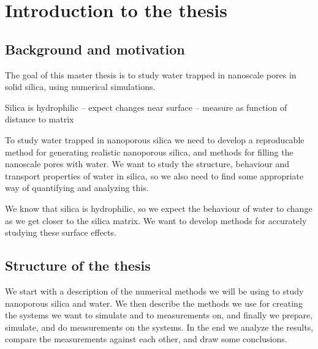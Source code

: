 \chapter*{Introduction to the thesis}%
%

\section*{Background and motivation}
%
The goal of this master thesis is to study water trapped in nanoscale pores in solid silica, using numerical simulations.  

Silica is hydrophilic -- expect changes near surface -- measure as function of distance to matrix


To study water trapped in nanoporous silica we need to develop a reproducable method for generating realistic nanoporous silica, and methods for filling the nanoscale pores with water. We want to study the structure, behaviour and transport properties of water in silica, so we also need to find some appropriate way of quantifying and analyzing this. 

We know that silica is hydrophilic, so we expect the behaviour of water to change as we get closer to the silica matrix. We want to develop methods for accurately studying these surface effects.


\section*{Structure of the thesis}
%
We start with a description of the numerical methods we will be using to study nanoporous silica and water. We then describe the methods we use for creating the systems we want to simulate and to measurements on, and finally we prepare, simulate, and do measurements on the systems. In the end we analyze the results, compare the measurements against each other, and draw some conclusions.

% 



